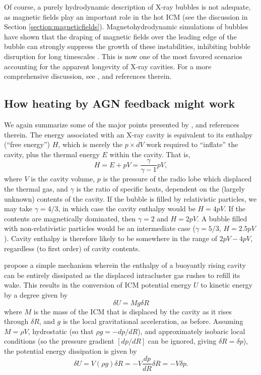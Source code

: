Of course, a purely hydrodynamic description of X-ray bubbles is not adequate,
as magnetic fields play an important role in the hot ICM (see the discussion in
Section \ref{section:magneticfields}). Magnetohydrodynamic simulations of
bubbles have shown that the draping of magnetic fields over the leading edge of
the bubble can strongly suppress the growth of these instabilities, inhibiting
bubble disruption for long timescales \citep{robinson04,dursi08}. This is now one of the most 
favored scenarios accounting for the apparent longevity of X-ray cavities. For a more 
comprehensive discussion, see \citet{robinson04,mcnamara07,dursi08}, and references therein.  


 

\subsection{How heating by AGN feedback might work}
We again summarize some of the major points presented by \citet{mcnamara07}, and references therein. The energy associated 
with an X-ray cavity is equivalent to its enthalpy (``free energy'') $H$, which is merely the  $p \times dV$ work required to ``inflate''
the cavity, plus the thermal energy $E$ within the cavity. That is,  
\begin{equation}
H = E + pV = \frac{\gamma}{\gamma-1} pV,
\end{equation}
where $V$ is the cavity volume, $p$ is the pressure of the radio lobe which displaced the thermal gas, and $\gamma$ is the ratio 
of specific heats, dependent on the (largely unknown) contents of the cavity. If the bubble is filled by relativistic particles, 
we may take $\gamma=4/3$, in which case the cavity enthalpy would be $H=4 pV$. If the contents are magnetically dominated, 
then $\gamma = 2$ and $H= 2 pV$. A bubble filled with non-relativistic particles would be an intermediate case ($\gamma = 5/3$, $H=2.5 pV$).
Cavity enthalpy is therefore likely to be somewhere in the range of $2pV - 4pV$, regardless (to first order) of cavity contents.    

\citet{churazov02, reynolds02, birzan04} propose a simple mechanism wherein 
the enthalpy of a buoyantly rising cavity can be entirely dissipated  
as the displaced intracluster gas rushes to refill its wake. This results in the conversion of ICM potential energy $U$ to kinetic energy 
by a degree given by  
\begin{equation} 
\delta U = M g \delta R 
\end{equation}
where $M$ is the mass of the ICM that is displaced by the cavity as it rises through $\delta R$, and $g$ is the local gravitational 
acceleration, as before. Assuming $M=\rho V$, hydrostatic (so that $\rho g = - dp / dR$), and approximately isobaric local conditions (so the pressure gradient $\left[dp/dR\right]$ can be ignored, giving $\delta R = \delta p$), the potential energy dissipation is given by 
\begin{equation} 
\delta U =  V \left(\rho g\right) \delta R = -V \frac{dp}{dR} \delta R = -V \delta p. 
\end{equation}

